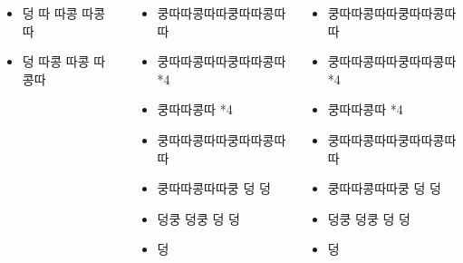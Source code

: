 \documentclass[20pt, a1paper ]{tikzposter}
\begin{document}
\begin{columns}
{\begin{LARGE}
\begin{itemize}
			\item 덩 따 따콩 따콩따
			\item 덩 따콩 따콩 따콩따

			\end{itemize}
			\end{LARGE}
		}


		{
			\setlength{\leftmargini}{2em}			
			\setlength{\labelsep}{1em} 
			\begin{LARGE}
			\begin{itemize}

			\item 쿵따따콩따따쿵따따콩따따 
			\item 쿵따따콩따따쿵따따콩따 *4
			\item 쿵따따콩따 *4
			\item 쿵따따콩따따쿵따따콩따따 
			\item 쿵따따콩따따쿵 덩 덩
			\item 덩쿵 덩쿵 덩 덩
			\item 덩

			\end{itemize}
			\end{LARGE}
		}

		{
			\setlength{\leftmargini}{2em}			
			\setlength{\labelsep}{1em} 
			\begin{LARGE}
			\begin{itemize}

			\item 쿵따따콩따따쿵따따콩따따 
			\item 쿵따따콩따따쿵따따콩따 *4
			\item 쿵따따콩따 *4
			\item 쿵따따콩따따쿵따따콩따따 
			\item 쿵따따콩따따쿵 덩 덩
			\item 덩쿵 덩쿵 덩 덩
			\item 덩

			\end{itemize}
			\end{LARGE}
		}


	\end{columns}
\end{document}
